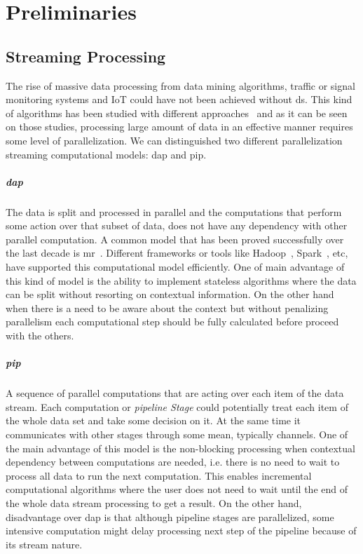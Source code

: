 \chapter{Preliminaries}\label{prelim}
\section{Streaming Processing}
The rise of massive data processing from data mining algorithms, traffic or signal monitoring systems and IoT could have not been 
achieved without \acrfull{ds}. This kind of algorithms has been studied with different approaches~\cite{enumeratingsg, exploting, onthefly} and as
it can be seen on those studies, processing large amount of data in an effective manner requires some level of parallelization.
We can distinguished two different parallelization streaming computational models: \acrfull{dap} and \acrfull{pip}. 

\paragraph{\acrlong{dap}} The data is split and processed in parallel and the computations that perform some action over that subset of data, does not have any dependency with other parallel computation. 
A common model that has been proved successfully over the last decade is \acrfull{mr}~\cite{mapreduce}. Different frameworks or tools like Hadoop~\cite{hadoop}, Spark~\cite{apachespark}, etc, have supported this computational 
model efficiently. One of main advantage of this kind of model is the ability to implement stateless algorithms where the data can be split without resorting on contextual information. On the other hand
when there is a need to be aware about the context but without penalizing parallelism each computational step should be fully calculated before proceed with the others.

\paragraph{\acrlong{pip}} A sequence of parallel computations that are acting over each item of the data stream. Each computation or \emph{pipeline Stage} could potentially
treat each item of the whole data set and take some decision on it. At the same time it communicates with other stages through some mean, typically channels. One of the main advantage of this model is the non-blocking processing
when contextual dependency between computations are needed, i.e. there is no need to wait to process all data to run the next computation. This enables incremental computational algorithms where the user does not need to 
wait until the end of the whole data stream processing to get a result. On the other hand, disadvantage over \acrshort{dap} is that although pipeline stages are parallelized, 
some intensive computation might delay processing next step of the pipeline because of its stream nature. 

